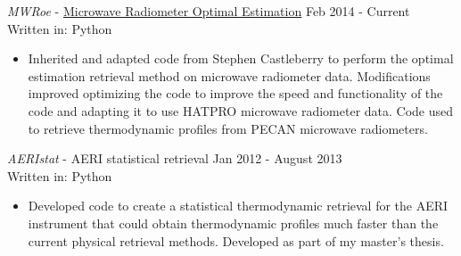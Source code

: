 \documentclass[10pt]{res} %
\begin{document}
\begin{resume}
{\sl MWRoe} - \href{https://github.com/wblumberg/MWRoe}{Microwave Radiometer Optimal Estimation} \hfill Feb 2014 - Current \\
Written in: Python
\begin{itemize} \itemsep -2pt %
\item Inherited and adapted code from Stephen Castleberry to perform the optimal estimation retrieval method on microwave radiometer data.  Modifications improved optimizing the code to improve the speed and functionality of the code and adapting it to use HATPRO microwave radiometer data.  Code used to retrieve thermodynamic profiles from PECAN microwave radiometers.
\end{itemize} 

{\sl AERIstat} - AERI statistical retrieval \hfill Jan 2012 - August 2013 \\
Written in: Python
\begin{itemize} \itemsep -2pt %
\item Developed code to create a statistical thermodynamic retrieval for the AERI instrument that could obtain thermodynamic profiles much faster than the current physical retrieval methods.  Developed as part of my master's thesis.
\end{itemize} 

 



\end{resume}
\end{document}
